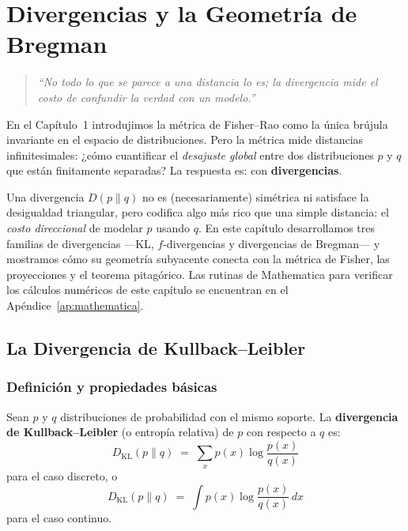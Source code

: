 
\chapter{Divergencias y la Geometría de Bregman}

\begin{quotation}
	\itshape
	``No todo lo que se parece a una distancia lo es; la divergencia mide el costo de confundir la verdad con un modelo.''
\end{quotation}

En el Capítulo~1 introdujimos la métrica de Fisher--Rao como la única brújula invariante en el espacio de distribuciones.  Pero la métrica mide distancias infinitesimales: ¿cómo cuantificar el \emph{desajuste global} entre dos distribuciones $p$ y $q$ que están finitamente separadas?  La respuesta es: con \textbf{divergencias}.

Una divergencia $D(p \| q)$ no es (necesariamente) simétrica ni satisface la desigualdad triangular, pero codifica algo más rico que una simple distancia: el \emph{costo direccional} de modelar $p$ usando $q$.  En este capítulo desarrollamos tres familias de divergencias ---KL, $f$-divergencias y divergencias de Bregman--- y mostramos cómo su geometría subyacente conecta con la métrica de Fisher, las proyecciones y el teorema pitagórico.  Las rutinas de Mathematica para verificar los cálculos numéricos de este capítulo se encuentran en el Apéndice~\ref{ap:mathematica}.

\section{La Divergencia de Kullback--Leibler}

\subsection{Definición y propiedades básicas}

\begin{definition}[Divergencia KL]
	Sean $p$ y $q$ distribuciones de probabilidad con el mismo soporte.  La \textbf{divergencia de Kullback--Leibler} (o entropía relativa) de $p$ con respecto a $q$ es:
	\[
	D_{\mathrm{KL}}(p \| q) \;=\; \sum_{x} p(x) \log \frac{p(x)}{q(x)}
	\]
	para el caso discreto, o
	\[
	D_{\mathrm{KL}}(p \| q) \;=\; \int p(x) \log \frac{p(x)}{q(x)}\, dx
	\]
	para el caso continuo.
\end{definition}

